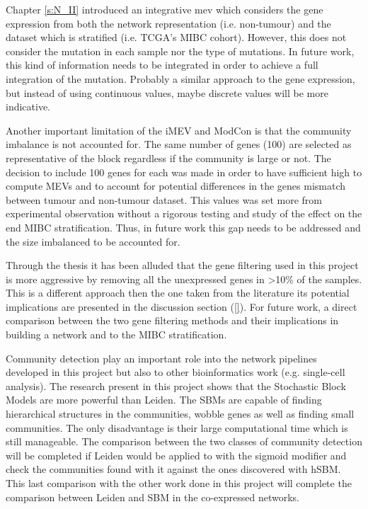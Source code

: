 Chapter \cref{s:N_II} introduced an integrative \acrfull{mev} which considers the gene expression from both the network representation (i.e. non-tumour) and the dataset which is stratified (i.e. TCGA's MIBC cohort). However, this does not consider the mutation in each sample nor the type of mutations. In future work, this kind of information needs to be integrated in order to achieve a full integration of the mutation. Probably a similar approach to the gene expression, but instead of using continuous values, maybe discrete values will be more indicative.

Another important limitation of the iMEV and ModCon is that the community imbalance is not accounted for. The same number of genes (100) are selected as representative of the block regardless if the community is large or not. The decision to include 100 genes for each was made in order to have sufficient high to compute MEVs and to account for potential differences in the genes mismatch between tumour and non-tumour dataset. This values was set more from experimental observation without a rigorous testing and study of the effect on the end MIBC stratification. Thus, in future work this gap needs to be addressed and the size imbalanced to be accounted for.

Through the thesis it has been alluded that the gene filtering used in this project is more aggressive by removing all the unexpressed genes in >10\% of the samples. This is a different approach then the one taken from the literature its potential implications are presented in the discussion section (\ref{}). For future work, a direct comparison between the two gene filtering methods and their implications in building a network and to the MIBC stratification.

Community detection play an important role into the network pipelines developed in this project but also to other bioinformatics work (e.g. single-cell analysis). The research present in this project shows that the Stochastic Block Models are more powerful than Leiden. The SBMs are capable of finding hierarchical structures in the communities, wobble genes as well as finding small communities. The only disadvantage is their large computational time which is still manageable. The comparison between the two classes of community detection will be completed if Leiden would be applied to with the sigmoid modifier and check the communities found with it against the ones discovered with hSBM. This last comparison with the other work done in this project will complete the comparison between Leiden and SBM in the co-expressed networks.

